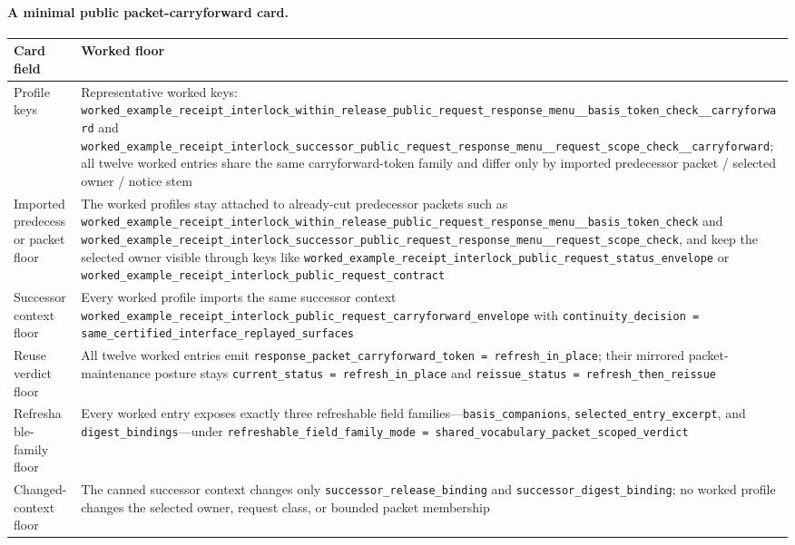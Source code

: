 \documentclass[11pt]{article}
\begin{document}
\paragraph{A minimal public packet-carryforward card.}
\begin{table}[t]
\centering
\footnotesize
\begin{tabularx}{\linewidth}{@{}l X@{}}
\toprule
Card field & Worked floor \\
\midrule
Profile keys & Representative worked keys: \nolinkurl{worked_example_receipt_interlock_within_release_public_request_response_menu__basis_token_check__carryforward} and \nolinkurl{worked_example_receipt_interlock_successor_public_request_response_menu__request_scope_check__carryforward}; all twelve worked entries share the same carryforward-token family and differ only by imported predecessor packet / selected owner / notice stem \\
Imported predecessor packet floor & The worked profiles stay attached to already-cut predecessor packets such as \nolinkurl{worked_example_receipt_interlock_within_release_public_request_response_menu__basis_token_check} and \nolinkurl{worked_example_receipt_interlock_successor_public_request_response_menu__request_scope_check}, and keep the selected owner visible through keys like \nolinkurl{worked_example_receipt_interlock_public_request_status_envelope} or \nolinkurl{worked_example_receipt_interlock_public_request_contract} \\
Successor context floor & Every worked profile imports the same successor context \nolinkurl{worked_example_receipt_interlock_public_request_carryforward_envelope} with \nolinkurl{continuity_decision = same_certified_interface_replayed_surfaces} \\
Reuse verdict floor & All twelve worked entries emit \nolinkurl{response_packet_carryforward_token = refresh_in_place}; their mirrored packet-maintenance posture stays \nolinkurl{current_status = refresh_in_place} and \nolinkurl{reissue_status = refresh_then_reissue} \\
Refreshable-family floor & Every worked entry exposes exactly three refreshable field families---\nolinkurl{basis_companions}, \nolinkurl{selected_entry_excerpt}, and \nolinkurl{digest_bindings}---under \nolinkurl{refreshable_field_family_mode = shared_vocabulary_packet_scoped_verdict} \\
Changed-context floor & The canned successor context changes only \nolinkurl{successor_release_binding} and \nolinkurl{successor_digest_binding}; no worked profile changes the selected owner, request class, or bounded packet membership \\

\end{tabularx}
\end{table}
\end{document}
